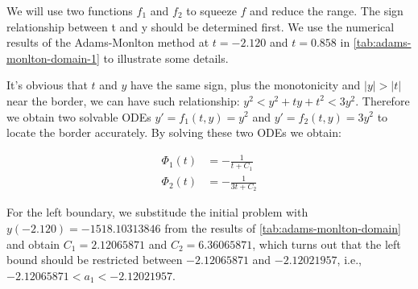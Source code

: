 \documentclass[a4paper]{article}
\begin{document}
	We will use two functions $f_1$ and $f_2$ to squeeze $f$ and reduce the range. The sign relationship between t and y should be determined first. We use the numerical results of the Adams-Monlton method at $t = -2.120$ and $t = 0.858$ in \autoref{tab:adams-monlton-domain-1} to illustrate some details.
	
	\begin{table}[H]
		\centering
		\caption{y of the results of the Adams-Monlton method when t = -2.120 and t = 0.858}
		\label{tab:adams-monlton-domain-1}
	\end{table}
	
	It's obvious that $t$ and $y$ have the same sign, plus the monotonicity and $|y| > |t|$ near the border, we can have such relationship: $y^2 < y^2 + ty + t^2 < 3y^2$. Therefore we obtain two solvable ODEs $y' = f_1(t, y) = y^2$ and $y' = f_2(t, y) = 3y^2$ to locate the border accurately. By solving these two ODEs we obtain:
	
	\begin{align}
		\Phi_1(t) &= -\frac{1}{t + C_1} \\
		\Phi_2(t) &= -\frac{1}{3t + C_2}
	\end{align}
	
	For the left boundary, we substitude the initial problem with $y(-2.120) = -1518.10313846$ from the results of \autoref{tab:adams-monlton-domain} and obtain $C_1 = 2.12065871$ and $C_2 = 6.36065871$, which turns out that the left bound should be restricted between $-2.12065871$ and $-2.12021957$, i.e., $-2.12065871 < a_1 < -2.12021957$.
	
\end{document}
